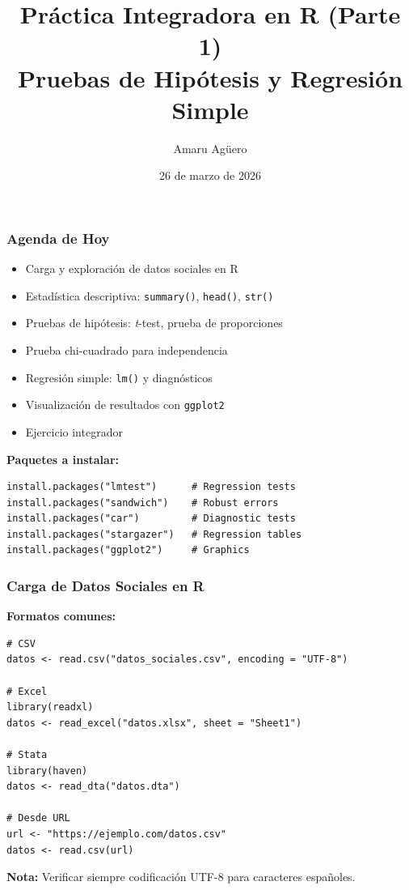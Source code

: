 \documentclass[aspectratio=169,11pt]{beamer}
\institute[CICS — UDD]{Doctorado en Ciencias de la Complejidad Social — CICS, UDD}
\title[Práctica R - Parte 1]{Práctica Integradora en R (Parte 1)\\Pruebas de Hipótesis y Regresión Simple}
\author[A. Agüero]{Amaru Agüero}
\date{26 de marzo de 2026}
\begin{document}
\begin{frame}
  \titlepage
\end{frame}

\begin{frame}[fragile]
  \frametitle{Agenda de Hoy}
  \small
  \begin{itemize}
    \item Carga y exploración de datos sociales en R
    \item Estadística descriptiva: \texttt{summary()}, \texttt{head()}, \texttt{str()}
    \item Pruebas de hipótesis: \textit{t}-test, prueba de proporciones
    \item Prueba chi-cuadrado para independencia
    \item Regresión simple: \texttt{lm()} y diagnósticos
    \item Visualización de resultados con \texttt{ggplot2}
    \item Ejercicio integrador
  \end{itemize}

  \vspace{0.5cm}
  \textbf{Paquetes a instalar:}
  \begin{lstlisting}
install.packages("lmtest")      # Regression tests
install.packages("sandwich")    # Robust errors
install.packages("car")         # Diagnostic tests
install.packages("stargazer")   # Regression tables
install.packages("ggplot2")     # Graphics
\end{lstlisting}
\end{frame}

\begin{frame}[fragile]
  \frametitle{Carga de Datos Sociales en R}

  \textbf{Formatos comunes:}
  \begin{lstlisting}
# CSV
datos <- read.csv("datos_sociales.csv", encoding = "UTF-8")

# Excel
library(readxl)
datos <- read_excel("datos.xlsx", sheet = "Sheet1")

# Stata
library(haven)
datos <- read_dta("datos.dta")

# Desde URL
url <- "https://ejemplo.com/datos.csv"
datos <- read.csv(url)
  \end{lstlisting}

  \small \textbf{Nota:} Verificar siempre codificación UTF-8 para caracteres españoles.
\end{frame}
\end{document}

